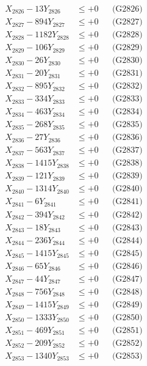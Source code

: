 \documentclass[a4paper,10pt]{article}
\begin{document}
{\begin{align}
X_{2826} - 13Y_{2826} &\leq +0 && \text{(G2826)} \\
X_{2827} - 894Y_{2827} &\leq +0 && \text{(G2827)} \\
X_{2828} - 1182Y_{2828} &\leq +0 && \text{(G2828)} \\
X_{2829} - 106Y_{2829} &\leq +0 && \text{(G2829)} \\
X_{2830} - 26Y_{2830} &\leq +0 && \text{(G2830)} \\
\allowbreak
X_{2831} - 20Y_{2831} &\leq +0 && \text{(G2831)} \\
X_{2832} - 895Y_{2832} &\leq +0 && \text{(G2832)} \\
X_{2833} - 334Y_{2833} &\leq +0 && \text{(G2833)} \\
X_{2834} - 463Y_{2834} &\leq +0 && \text{(G2834)} \\
X_{2835} - 268Y_{2835} &\leq +0 && \text{(G2835)} \\
X_{2836} - 27Y_{2836} &\leq +0 && \text{(G2836)} \\
X_{2837} - 563Y_{2837} &\leq +0 && \text{(G2837)} \\
X_{2838} - 1415Y_{2838} &\leq +0 && \text{(G2838)} \\
X_{2839} - 121Y_{2839} &\leq +0 && \text{(G2839)} \\
X_{2840} - 1314Y_{2840} &\leq +0 && \text{(G2840)} \\
\allowbreak
X_{2841} - 6Y_{2841} &\leq +0 && \text{(G2841)} \\
X_{2842} - 394Y_{2842} &\leq +0 && \text{(G2842)} \\
X_{2843} - 18Y_{2843} &\leq +0 && \text{(G2843)} \\
X_{2844} - 236Y_{2844} &\leq +0 && \text{(G2844)} \\
X_{2845} - 1415Y_{2845} &\leq +0 && \text{(G2845)} \\
X_{2846} - 65Y_{2846} &\leq +0 && \text{(G2846)} \\
X_{2847} - 44Y_{2847} &\leq +0 && \text{(G2847)} \\
X_{2848} - 756Y_{2848} &\leq +0 && \text{(G2848)} \\
X_{2849} - 1415Y_{2849} &\leq +0 && \text{(G2849)} \\
X_{2850} - 1333Y_{2850} &\leq +0 && \text{(G2850)} \\
\allowbreak
X_{2851} - 469Y_{2851} &\leq +0 && \text{(G2851)} \\
X_{2852} - 209Y_{2852} &\leq +0 && \text{(G2852)} \\
X_{2853} - 1340Y_{2853} &\leq +0 && \text{(G2853)} \\

\end{align}}
\end{document}
